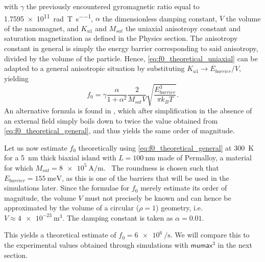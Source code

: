 \documentclass[11pt,a4paper,english]{article}
\newcommand{\mumax}{$\mathsf{mumax}^3$}
\begin{document}
with $\gamma$ the previously encountered gyromagnetic ratio equal to \SI{1.7595e11}{\radian\per\tesla\per\second}, $\alpha$ the dimensionless damping constant, $V$ the volume of the nanomagnet, and $K_{u1}$ and $M_{sat}$ the uniaxial anisotropy constant and saturation magnetization as defined in the Physics section. The anisotropy constant in general is simply the energy barrier corresponding to said anisotropy, divided by the volume of the particle. Hence, \cref{eq:f0_theoretical_uniaxial} can be adapted to a general anisotropic situation by substituting $K_{u1} \rightarrow E_{barrier}/V$, yielding
\begin{equation}
    f_0 = \gamma \frac{\alpha}{1+\alpha^2} \frac{2}{M_{sat} V} \sqrt{\frac{E_{barrier}^3}{\pi k_B T}} \mathrm{.}
    \label{eq:f0_theoretical_general}
\end{equation}
An alternative formula is found in \cite{f0_alternative_Jonathan}, which after simplification in the absence of an external field simply boils down to twice the value obtained from \cref{eq:f0_theoretical_general}, and thus yields the same order of magnitude. \par
Let us now estimate $f_0$ theoretically using \cref{eq:f0_theoretical_general} at \SI{300}{\kelvin} for a \SI{5}{\nano\metre} thick biaxial island with $L=\SI{100}{\nano\metre}$ made of Permalloy, a material for which $M_{sat}=\SI{8e5}{\ampere\per\metre}$.~\cite{MuMax3} The roundness is chosen such that $E_{barrier}=\SI{155}{\milli\electronvolt}$, as this is one of the barriers that will be used in the simulations later. Since the formulae for $f_0$ merely estimate its order of magnitude, the volume $V$ must not precisely be known and can hence be approximated by the volume of a circular ($\rho=1$) geometry, i.e. $V\approx\SI{4e-23}{\metre\cubed}$. The damping constant is taken as $\alpha=0.01$. \par
This yields a theoretical estimate of $f_0 = \SI{6e6}{\per\second}$. We will compare this to the experimental values obtained through simulations with \mumax{} in the next section.
\end{document}
